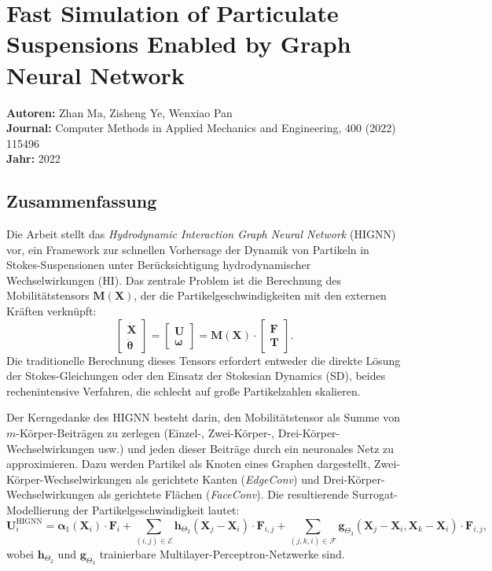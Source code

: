 \documentclass[a4paper,12pt]{article}
\begin{document}
\section*{Fast Simulation of Particulate Suspensions Enabled by Graph Neural Network}
\textbf{Autoren:} Zhan Ma, Zisheng Ye, Wenxiao Pan \\
\textbf{Journal:} Computer Methods in Applied Mechanics and Engineering, 400 (2022) 115496 \\
\textbf{Jahr:} 2022

\subsection*{Zusammenfassung}

Die Arbeit stellt das \emph{Hydrodynamic Interaction Graph Neural Network} (HIGNN) vor, ein Framework zur schnellen Vorhersage der Dynamik von Partikeln in Stokes-Suspensionen unter Berücksichtigung hydrodynamischer Wechselwirkungen (HI). Das zentrale Problem ist die Berechnung des Mobilitätstensors $\mathbf{M}(\mathbf{X})$, der die Partikelgeschwindigkeiten mit den externen Kräften verknüpft:
\[
\begin{bmatrix} \dot{\mathbf{X}} \\ \dot{\boldsymbol{\theta}} \end{bmatrix} = \begin{bmatrix} \mathbf{U} \\ \boldsymbol{\omega} \end{bmatrix} = \mathbf{M}(\mathbf{X}) \cdot \begin{bmatrix} \mathbf{F} \\ \mathbf{T} \end{bmatrix}.
\]
Die traditionelle Berechnung dieses Tensors erfordert entweder die direkte Lösung der Stokes-Gleichungen oder den Einsatz der Stokesian Dynamics (SD), beides rechenintensive Verfahren, die schlecht auf große Partikelzahlen skalieren.

Der Kerngedanke des HIGNN besteht darin, den Mobilitätstensor als Summe von $m$-Körper-Beiträgen zu zerlegen (Einzel-, Zwei-Körper-, Drei-Körper-Wechselwirkungen usw.) und jeden dieser Beiträge durch ein neuronales Netz zu approximieren. Dazu werden Partikel als Knoten eines Graphen dargestellt, Zwei-Körper-Wechselwirkungen als gerichtete Kanten (\emph{EdgeConv}) und Drei-Körper-Wechselwirkungen als gerichtete Flächen (\emph{FaceConv}). Die resultierende Surrogat-Modellierung der Partikelgeschwindigkeit lautet:
\[
\mathbf{U}_i^{\mathrm{HIGNN}} = \boldsymbol{\alpha}_1(\mathbf{X}_i) \cdot \mathbf{F}_i + \sum_{(i,j) \in \mathcal{E}} \mathbf{h}_{\Theta_2}(\mathbf{X}_j - \mathbf{X}_i) \cdot \mathbf{F}_{i,j} + \sum_{(j,k,i) \in \mathcal{F}} \mathbf{g}_{\Theta_3}(\mathbf{X}_j - \mathbf{X}_i, \mathbf{X}_k - \mathbf{X}_i) \cdot \mathbf{F}_{i,j},
\]
wobei $\mathbf{h}_{\Theta_2}$ und $\mathbf{g}_{\Theta_3}$ trainierbare Multilayer-Perceptron-Netzwerke sind.
\end{document}
